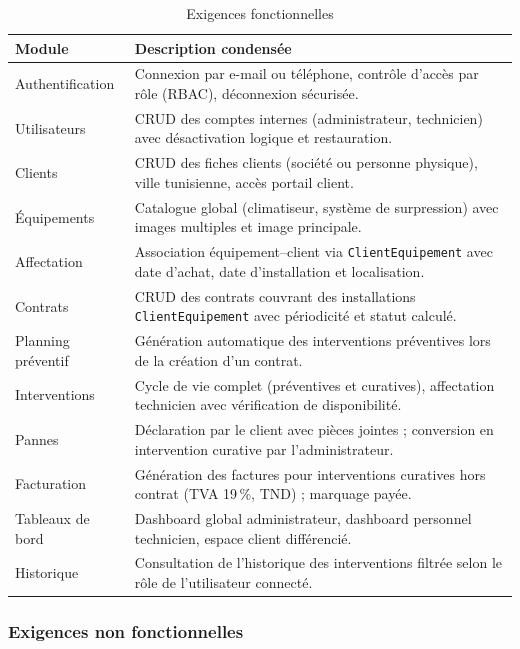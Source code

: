 \begin{table}[H]
\centering
\caption{Exigences fonctionnelles}
\label{tab:ch2:exigences_fonctionnelles}
\begin{tabular}{|p{3.8cm}|p{10.7cm}|}
\hline
\textbf{Module} & \textbf{Description condensée} \\
\hline
Authentification & Connexion par e-mail ou téléphone, contrôle d'accès par rôle (RBAC), déconnexion sécurisée. \\
\hline
Utilisateurs & CRUD des comptes internes (administrateur, technicien) avec désactivation logique et restauration. \\
\hline
Clients & CRUD des fiches clients (société ou personne physique), ville tunisienne, accès portail client. \\
\hline
Équipements & Catalogue global (climatiseur, système de surpression) avec images multiples et image principale. \\
\hline
Affectation & Association équipement–client via \texttt{ClientEquipement} avec date d'achat, date d'installation et localisation. \\
\hline
Contrats & CRUD des contrats couvrant des installations \texttt{ClientEquipement} avec périodicité et statut calculé. \\
\hline
Planning préventif & Génération automatique des interventions préventives lors de la création d'un contrat. \\
\hline
Interventions & Cycle de vie complet (préventives et curatives), affectation technicien avec vérification de disponibilité. \\
\hline
Pannes & Déclaration par le client avec pièces jointes ; conversion en intervention curative par l'administrateur. \\
\hline
Facturation & Génération des factures pour interventions curatives hors contrat (TVA 19\,\%, TND) ; marquage payée. \\
\hline
Tableaux de bord & Dashboard global administrateur, dashboard personnel technicien, espace client différencié. \\
\hline
Historique & Consultation de l'historique des interventions filtrée selon le rôle de l'utilisateur connecté. \\
\hline
\end{tabular}
\end{table}

\subsubsection{Exigences non fonctionnelles}


